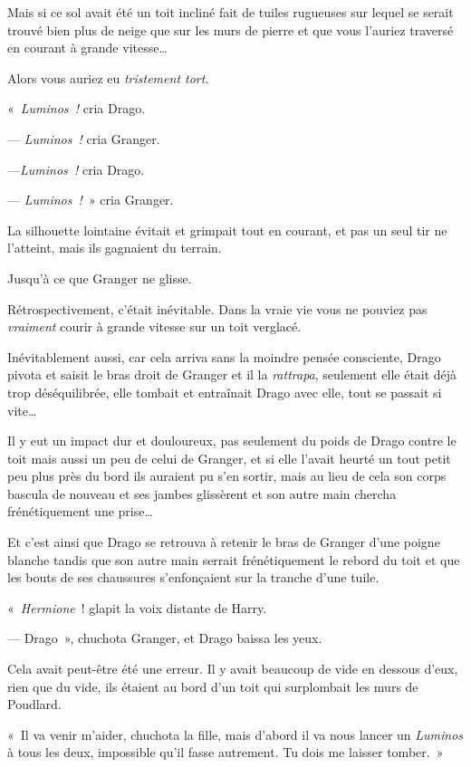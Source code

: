 Mais si ce sol avait été un toit incliné fait de tuiles rugueuses sur lequel se serait trouvé bien plus de neige que sur les murs de pierre et que vous l'auriez traversé en courant à grande vitesse…

Alors vous auriez eu \emph{tristement tort}.

«~\emph{Luminos~!} cria Drago.

--- \emph{Luminos~!} cria Granger.

---\emph{Luminos~!} cria Drago.

--- \emph{Luminos~!}~» cria Granger.

La silhouette lointaine évitait et grimpait tout en courant, et pas un seul tir ne l'atteint, mais ils gagnaient du terrain.

Jusqu'à ce que Granger ne glisse.

Rétrospectivement, c'était inévitable. Dans la vraie vie vous ne pouviez pas \emph{vraiment} courir à grande vitesse sur un toit verglacé.

Inévitablement aussi, car cela arriva sans la moindre pensée consciente, Drago pivota et saisit le bras droit de Granger et il la \emph{rattrapa}, seulement elle était déjà trop déséquilibrée, elle tombait et entraînait Drago avec elle, tout se passait si vite…

Il y eut un impact dur et douloureux, pas seulement du poids de Drago contre le toit mais aussi un peu de celui de Granger, et si elle l'avait heurté un tout petit peu plus près du bord ils auraient pu s'en sortir, mais au lieu de cela son corps bascula de nouveau et ses jambes glissèrent et son autre main chercha frénétiquement une prise…

Et c'est ainsi que Drago se retrouva à retenir le bras de Granger d'une poigne blanche tandis que son autre main serrait frénétiquement le rebord du toit et que les bouts de ses chaussures s'enfonçaient sur la tranche d'une tuile.

«~\emph{Hermione}~! glapit la voix distante de Harry.

--- Drago~», chuchota Granger, et Drago baissa les yeux.

Cela avait peut-être été une erreur. Il y avait beaucoup de vide en dessous d'eux, rien que du vide, ils étaient au bord d'un toit qui surplombait les murs de Poudlard.

«~Il va venir m'aider, chuchota la fille, mais d'abord il va nous lancer un \emph{Luminos} à tous les deux, impossible qu'il fasse autrement. Tu dois me laisser tomber.~»


